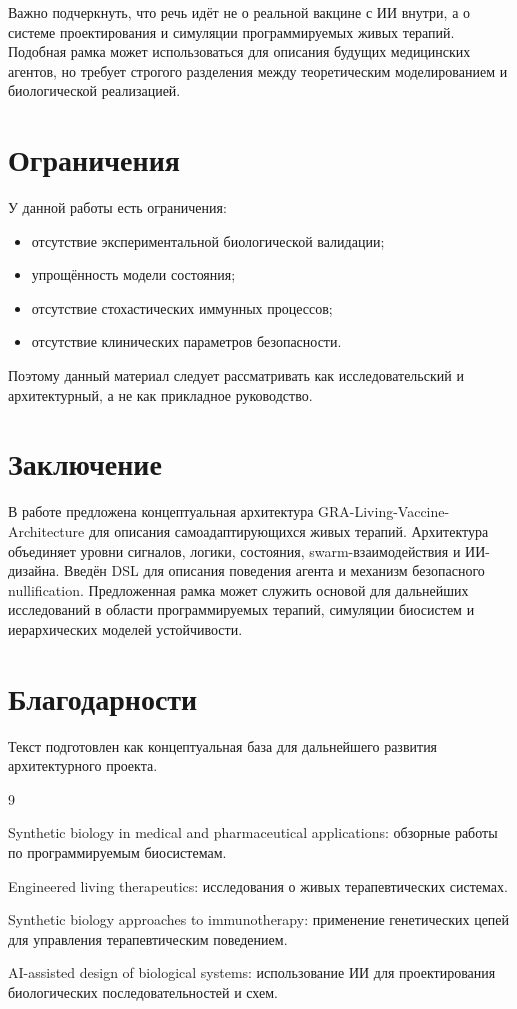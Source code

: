 \documentclass[12pt,a4paper]{article}
\begin{document}
Важно подчеркнуть, что речь идёт не о реальной вакцине с ИИ внутри, а о системе проектирования и симуляции программируемых живых терапий. Подобная рамка может использоваться для описания будущих медицинских агентов, но требует строгого разделения между теоретическим моделированием и биологической реализацией.

\section{Ограничения}

У данной работы есть ограничения:
\begin{itemize}
    \item отсутствие экспериментальной биологической валидации;
    \item упрощённость модели состояния;
    \item отсутствие стохастических иммунных процессов;
    \item отсутствие клинических параметров безопасности.
\end{itemize}

Поэтому данный материал следует рассматривать как исследовательский и архитектурный, а не как прикладное руководство.

\section{Заключение}

В работе предложена концептуальная архитектура GRA-Living-Vaccine-Architecture для описания самоадаптирующихся живых терапий. Архитектура объединяет уровни сигналов, логики, состояния, swarm-взаимодействия и ИИ-дизайна. Введён DSL для описания поведения агента и механизм безопасного nullification. Предложенная рамка может служить основой для дальнейших исследований в области программируемых терапий, симуляции биосистем и иерархических моделей устойчивости.

\section*{Благодарности}

Текст подготовлен как концептуальная база для дальнейшего развития архитектурного проекта.

\begin{thebibliography}{9}

Synthetic biology in medical and pharmaceutical applications: обзорные работы по программируемым биосистемам.

Engineered living therapeutics: исследования о живых терапевтических системах.

Synthetic biology approaches to immunotherapy: применение генетических цепей для управления терапевтическим поведением.

AI-assisted design of biological systems: использование ИИ для проектирования биологических последовательностей и схем.

\end{thebibliography}
\end{document}
